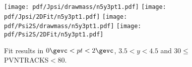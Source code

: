 \begin{figure}[H]
\begin{center}
\texttt{[image: pdf/Jpsi/drawmass/n5y3pt1.pdf]}
\texttt{[image: pdf/Jpsi/2DFit/n5y3pt1.pdf]}
\vspace*{-0.5cm}
\texttt{[image: pdf/Psi2S/drawmass/n5y3pt1.pdf]}
\texttt{[image: pdf/Psi2S/2DFit/n5y3pt1.pdf]}
\vspace*{-0.5cm}
\end{center}
\caption{Fit results in $0\gevc<pt<2\gevc$, $3.5<y<4.5$ and 30$\leq$PVNTRACKS$<$80.}
\label{Fitn5y3pt1}
\end{figure}
